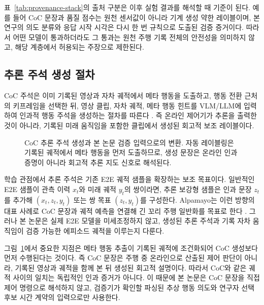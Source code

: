 표~\ref{tab:provenance-stack}의 출처 구분은 이후 실험 결과를 해석할 때 기준이 된다. 예를 들어 CoC 문장과 품질 점수는 원천 센서값이 아니라 기계 생성 약한 레이블이며, 본 연구의 의도 분류와 응답 시작 시각은 다시 한 번 규칙으로 도출된 검증 증거이다. 따라서 어떤 모델이 통과하더라도 그 통과는 원천 주행 기록 전체의 안전성을 의미하지 않고, 해당 계층에서 허용되는 주장으로 제한된다.

\subsection{추론 주석 생성 절차}
CoC 주석은 이미 기록된 영상과 자차 궤적에서 메타 행동을 도출하고, 행동 전환 근처의 키프레임을 선택한 뒤, 영상 클립, 자차 궤적, 메타 행동 힌트를 VLM/LLM에 입력하여 인과적 행동 주석을 생성하는 절차를 따른다 \cite{nvidia2026autolabeler}. 즉 온라인 제어기가 추론을 출력한 것이 아니라, 기록된 미래 움직임을 포함한 클립에서 생성된 회고적 보조 레이블이다.

\begin{figure}[t]
\centering

\caption{CoC 추론 주석 생성과 본 논문 검증 입력으로의 변환. 자동 레이블링은 기록된 궤적에서 메타 행동을 먼저 도출하므로, 생성 문장은 온라인 인과 증명이 아니라 회고적 추론 지도 신호로 해석된다.}
\label{fig:annotation-flow}
\end{figure}

학습 관점에서 추론 주석은 기존 E2E 궤적 샘플을 확장하는 보조 목표이다. 일반적인 E2E 샘플이 관측 이력 $x_t$와 미래 궤적 $y_t$의 쌍이라면, 추론 보강형 샘플은 인과 문장 $z_t$를 추가해 $(x_t,z_t,y_t)$ 또는 쌍 목표 $(z_t,y_t)$를 구성한다. Alpamayo는 이런 방향의 대표 사례로 CoC 문장과 궤적 예측을 연결해 긴 꼬리 주행 일반화를 목표로 한다 \cite{wang2025alpamayo}. 그러나 본 논문은 실제 E2E 모델을 미세조정하지 않고, 생성된 추론 주석과 기록 자차 움직임이 검증 가능한 에피소드 궤적을 이루는지 다룬다.

그림~\ref{fig:annotation-flow}에서 중요한 지점은 메타 행동 추출이 기록된 궤적에 조건화되어 CoC 생성보다 먼저 수행된다는 것이다. 즉 CoC 문장은 주행 중 온라인으로 산출된 제어 판단이 아니라, 기록된 영상과 궤적을 함께 본 뒤 생성된 회고적 설명이다. 따라서 CoC와 같은 궤적 사이의 일치는 독립적인 인과 증거가 아니다. 이 때문에 본 논문은 CoC 문장을 직접 제어 명령으로 해석하지 않고, 검증기가 확인할 파싱된 추상 행동 의도와 연구자 선택 후보 시간 계약의 입력으로만 사용한다.

